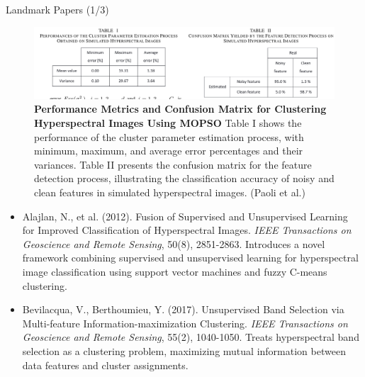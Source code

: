 \documentclass[10pt,svgnames,fragile]{beamer}
\begin{document}
\begin{frame}{Landmark Papers (1/3)}
\footnotesize
\begin{figure}
    \centering
    \includegraphics[width=1\linewidth]{paoli_tables.png}
    \caption{\textbf{Performance Metrics and Confusion Matrix for Clustering Hyperspectral Images Using MOPSO} Table I shows the performance of the cluster parameter estimation process, with minimum, maximum, and average error percentages and their variances. Table II presents the confusion matrix for the feature detection process, illustrating the classification accuracy of noisy and clean features in simulated hyperspectral images. (Paoli et al.)\cite{amigoHyperspectralImageAnalysis2015}}
    \label{fig:paoli_tables}
\end{figure}
\vspace{-0.5cm} %
\begin{itemize}
    \item Alajlan, N., et al. (2012). Fusion of Supervised and Unsupervised Learning for Improved Classification of Hyperspectral Images. \textit{IEEE Transactions on Geoscience and Remote Sensing}, 50(8), 2851-2863. \href{https://consensus.app/papers/fusion-supervised-learning-improved-classification-alajlan/7f6e4675e84c5be298365122c11f6858/?utm_source=chatgpt}{\color{blue}{DOI: 10.1109/TGRS.2011.2172168}}
    {\color{gray}Introduces a novel framework combining supervised and unsupervised learning for hyperspectral image classification using support vector machines and fuzzy C-means clustering.}

    \item Bevilacqua, V., Berthoumieu, Y. (2017). Unsupervised Band Selection via Multi-feature Information-maximization Clustering. \textit{IEEE Transactions on Geoscience and Remote Sensing}, 55(2), 1040-1050. \href{https://consensus.app/papers/unsupervised-band-selection-multifeature-bevilacqua/d351f61026a35f8f9463f907b37e7d27/?utm_source=chatgpt}{\color{blue}{DOI: 10.1109/TGRS.2016.2626904}}
    {\color{gray}Treats hyperspectral band selection as a clustering problem, maximizing mutual information between data features and cluster assignments.}
\end{itemize}
\end{frame}
\end{document}
